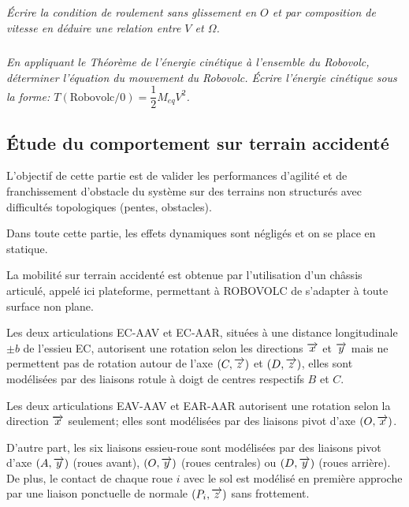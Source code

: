 \documentclass[10pt,fleqn]{article} %
\begin{document}
\begin{multicols}{2}
\subparagraph{}
\textit{Écrire la condition de roulement sans glissement en $O$ et par composition de vitesse en déduire une relation entre $V$ et $\Omega$.}
\ifprof
\begin{corrige}
\end{corrige}
\else
\fi



\subparagraph{}
\textit{En appliquant le Théorème de l'énergie cinétique à l'ensemble du Robovolc, déterminer l'équation du mouvement du Robovolc. Écrire l'énergie cinétique sous la forme:  $T\left(\text{Robovolc}/0\right)=\dfrac{1}{2} M_{eq}V^2$.}
\ifprof
\begin{corrige}
\end{corrige}
\else
\fi

\subsection*{Étude du comportement sur terrain accidenté}

\begin{obj}
L'objectif de cette partie est de valider les performances d'agilité et de franchissement d'obstacle du système sur des terrains non structurés avec difficultés topologiques (pentes, obstacles).
\end{obj}

Dans toute cette partie, les effets dynamiques sont négligés et on se place en statique. 

La mobilité sur terrain accidenté est obtenue par l'utilisation d'un châssis articulé, appelé ici plateforme, permettant à ROBOVOLC de s'adapter à toute surface non plane.


Les deux articulations EC-AAV et EC-AAR, situées à une distance longitudinale $\pm b$ de l'essieu EC, autorisent une rotation selon les directions $\overrightarrow{x}$ et $\overrightarrow{y}$ mais ne permettent pas de rotation autour de l’axe $\left(C,\overrightarrow{z}\right)$ et $\left(D,\overrightarrow{z}\right)$, elles sont modélisées par des liaisons rotule à doigt de centres respectifs $B$ et $C$.

Les deux articulations EAV-AAV et EAR-AAR autorisent une rotation selon la direction $\overrightarrow{x}$ seulement; elles sont modélisées par des liaisons pivot d'axe $\left(O,\overrightarrow{x}\right)$.

D'autre part, les six liaisons essieu-roue sont modélisées par des liaisons pivot d'axe $\left(A,\overrightarrow{y}\right)$ (roues avant), $\left(O,\overrightarrow{y}\right)$ (roues centrales) ou $\left(D,\overrightarrow{y}\right)$ (roues arrière). De plus, le contact de chaque roue $i$ avec le sol est modélisé en première approche par une liaison ponctuelle de normale $\left(P_i,\overrightarrow{z}\right)$ sans frottement.



\end{multicols}
\end{document}
